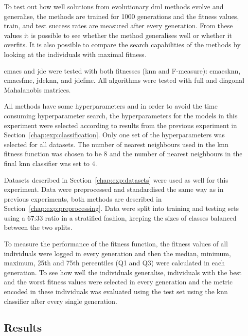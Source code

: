 To test out how well solutions from evolutionary \ac{dml} methods evolve and generalise, the methods are trained for 1000 generations and the fitness values, train, and test success rates are measured after every generation. From these values it is possible to see whether the method generalises well or whether it overfits. It is also possible to compare the search capabilities of the methods by looking at the individuals with maximal fitness.

\ac{cmaes} and \ac{jde} were tested with both fitnesses (\ac{knn} and \mbox{F-measure}): \ac{cmaesknn}, \ac{cmaesfme}, \ac{jdeknn}, and \ac{jdefme}. All algorithms were tested with full and diagonal Mahalanobis matrices.

All methods have some hyperparameters and in order to avoid the time consuming hyperparameter search, the hyperparameters for the models in this experiment were selected according to results from the previous experiment in Section~\ref{chap:exp:classification}. Only one set of the hyperparameters was selected for all datasets. The number of nearest neighbours used in the \ac{knn} fitness function was chosen to be 8 and the number of nearest neighbours in the final \ac{knn} classifier was set to 4.

Datasets described in Section~\ref{chap:exp:datasets} were used as well for this experiment. Data were preprocessed and standardised the same way as in previous experiments, both methods are described in Section~\ref{chap:exp:preprocessing}. Data were split into training and testing sets using a 67:33 ratio in a stratified fashion, keeping the sizes of classes balanced between the two splits.

To measure the performance of the fitness function, the fitness values of all individuals were logged in every generation and then the median, minimum, maximum, 25th and 75th percentiles (Q1 and Q3) were calculated in each generation. To see how well the individuals generalise, individuals with the best and the worst fitness values were selected in every generation and the metric encoded in these individuals was evaluated using the test set using the \ac{knn} classifier after every single generation.

\subsection{Results}

